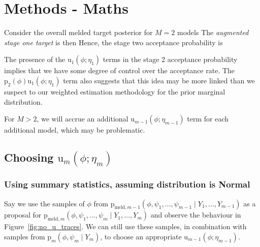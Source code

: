 \documentclass[10pt,a4paper,]{article}
\newcommand{\pd}{\text{p}}
\newcommand{\tarw}{\text{u}}
\newcommand{\Nm}{M}
\newcommand{\modelindex}{m}
\begin{document}
\section{Methods - Maths}\label{methods---maths}

Consider the overall melded target posterior for \(\Nm = 2\) models
 The
\emph{augmented stage one target} is then
 Hence, the stage two
acceptance probability is


The presence of the \(\tarw_{1}(\phi; \eta_{1})\) terms in the stage 2
acceptance probability implies that we have some degree of control over
the acceptance rate. The \(\pd_{2}(\phi) \tarw_{1}(\phi; \eta_{1})\)
term also suggests that this idea may be more linked than we suspect to
our weighted estimation methodology for the prior marginal distribution.

For \(\Nm > 2\), we will accrue an additional
\(\tarw_{\modelindex - 1}(\phi; \eta_{\modelindex - 1})\) term for each
additional model, which may be problematic.

\subsection{\texorpdfstring{Choosing
\(\tarw_{\modelindex}(\phi; \eta_{\modelindex})\)}{Choosing \textbackslash{}tarw\_\{\textbackslash{}modelindex\}(\textbackslash{}phi; \textbackslash{}eta\_\{\textbackslash{}modelindex\})}}\label{choosing-tarw_modelindexphi-eta_modelindex}

\subsubsection{Using summary statistics, assuming distribution is
Normal}\label{using-summary-statistics-assuming-distribution-is-normal}

Say we use the samples of \(\phi\) from
\(\pd_{\text{meld}, \modelindex - 1}(\phi, \psi_{1}, \ldots, \psi_{\modelindex - 1} \mid Y_{1}, \ldots, Y_{\modelindex - 1})\)
as a proposal for
\(\pd_{\text{meld}, \modelindex}(\phi, \psi_{1}, \ldots, \psi_{\modelindex} \mid Y_{1}, \ldots, Y_{\modelindex})\)
and observe the behaviour in Figure~\ref{fig:no_u_traces}. We can still
use these samples, in combination with samples from
\(\pd_{\modelindex}(\phi, \psi_{\modelindex} \mid Y_{\modelindex})\), to
choose an appropriate
\(\tarw_{\modelindex - 1}(\phi; \eta_{\modelindex - 1})\).
\end{document}
